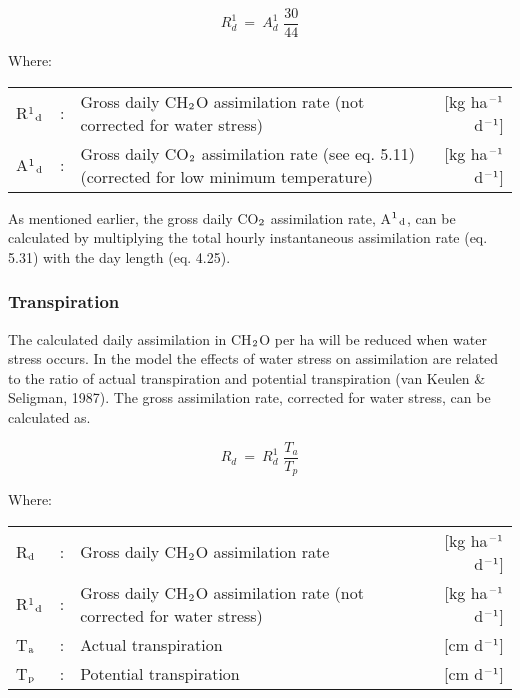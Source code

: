 \begin{equation}
R _{d}^{1} ~=~ A _{d}^{1} \,\,{\frac{30}{44}}
\end{equation}

Where:\\[5pt]
\begin{tabularx}{\textwidth}{llXr}
R$^{{\rm 1}}$$_{{\rm d}}$ &:& Gross daily CH$_{{\rm 2}}$O assimilation rate 
   (not corrected for water stress) &   [kg ha$^{{\rm -1}}$ d$^{{\rm -1}}$]\\
A$^{{\rm 1}}$$_{{\rm d}}$ &:& Gross daily CO$_{{\rm 2}}$ assimilation rate 
   (see eq. 5.11) (corrected for low minimum temperature)   &    [kg ha$^{{\rm -1}}$ d$^{{\rm -1}}$]\\   
\end{tabularx}
 
As mentioned earlier, the gross daily CO$_{{\rm 2}}$ assimilation rate, A$^{{\rm 1}}$$_{{\rm d}}$, can be calculated by
multiplying the total hourly instantaneous assimilation rate (eq. 5.31) with the day length
(eq. 4.25). 

\subsubsection{Transpiration}
The calculated daily assimilation in CH$_{{\rm 2}}$O per ha will be reduced when water stress
occurs. In the model the effects of water stress on assimilation are related to the ratio of
actual transpiration and potential transpiration (van Keulen \& Seligman, 1987).
The gross assimilation rate, corrected for water stress, can be calculated as.

\begin{equation}
R _{d} ~=~ R _{d}^{1} \,\,{\frac{T _{a} }{T _{p} }}
\end{equation}

Where:\\[5pt]
\begin{tabularx}{\textwidth}{llXr}
R$_{{\rm d}}$ &:& Gross daily CH$_{{\rm 2}}$O assimilation rate   &     [kg ha$^{{\rm -1}}$ d$^{{\rm -1}}$]\\
R$^{{\rm 1}}$$_{{\rm d}}$ &:& Gross daily CH$_{{\rm 2}}$O assimilation rate
   (not corrected for water stress)   &     [kg ha$^{{\rm -1}}$ d$^{{\rm -1}}$]\\
T$_{{\rm a}}$ &:& Actual transpiration   &     [cm d$^{{\rm -1}}$]\\
T$_{{\rm p}}$ &:& Potential transpiration   &     [cm d$^{{\rm -1}}$]\\
\end{tabularx}

